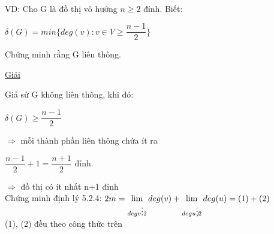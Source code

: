 \documentclass[12pt,oneside]{book}
\begin{document}
\\VD: Cho G là đồ thị vô hướng $n \geq 2$ đỉnh. Biết:
\begin{center}
    $\delta(G) = min\{deg(v):v \in V \geq \dfrac{n-1}{2} \}$
\end{center}
Chứng minh rằng G liên thông.
\begin{center}
    \underline{Giải}
\end{center}
Giả sử G không liên thông, khi đó:
\begin{center}
    $\delta(G) \geq \dfrac{n-1}{2} $
\end{center}
$\Rightarrow$ mỗi thành phần liên thông chứa ít ra
\begin{center}
    $\dfrac{n-1}{2}+1 = \dfrac{n+1}{2}$ đỉnh.
\end{center}
$\Rightarrow$ đồ thị có ít nhất n+1 đỉnh
\\ Chứng minh định lý 5.2.4: $2m = \displaystyle\lim_{deg v \vdots 2} deg(v)+\displaystyle\lim_{deg u \not\vdots 2}deg(u) = (1)+(2)$
\\ (1), (2) đều theo công thức trên
\end{document}
